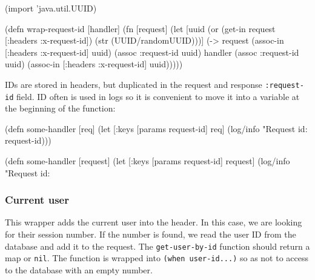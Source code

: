 \else

\begin{clojure}
(import 'java.util.UUID)

(defn wrap-request-id [handler]
  (fn [request]
    (let [uuid (or (get-in request [:headers :x-request-id])
                   (str (UUID/randomUUID)))]
      (-> request
          (assoc-in [:headers :x-request-id] uuid)
          (assoc :request-id uuid)
          handler
          (assoc :request-id uuid)
          (assoc-in [:headers :x-request-id] uuid)))))
\end{clojure}

\fi


IDs are stored in headers, but duplicated in the request and response \verb|:request-id| field. ID often is used in logs so it is convenient to move it into a variable at the beginning of the function:


\ifx\DEVICETYPE\MOBILE

\begin{clojure}
(defn some-handler [req]
  (let [{:keys [params request-id]} req]
    (log/info "Request id: %
              request-id)))
\end{clojure}

\else

\begin{clojure}
(defn some-handler [request]
  (let [{:keys [params request-id]} request]
    (log/info "Request id: %
\end{clojure}

\fi

\subsubsection*{Current user}


This wrapper adds the current user into the header. In this case, we are looking for their session number. If the number is found, we read the user ID from the database and add it to the request. The \verb|get-user-by-id| function should return a map or \verb|nil|. The function is wrapped into \verb|(when user-id...)| so as not to access to the database with an empty number.


